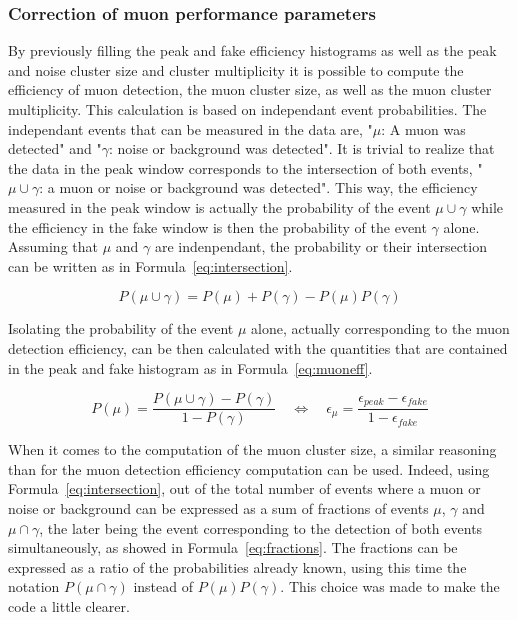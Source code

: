 		\subsubsection{Correction of muon performance parameters}
		\label{app2:sssec:effcorr}
		
	By previously filling the peak and fake efficiency histograms as well as the peak and noise cluster size and cluster multiplicity it is possible to compute the efficiency of muon detection, the muon cluster size, as well as the muon cluster multiplicity. This calculation is based on independant event probabilities. The independant events that can be measured in the data are, "$\mu$: A muon was detected" and "$\gamma$: noise or background was detected". It is trivial to realize that the data in the peak window corresponds to the intersection of both events, "$\mu\cup\gamma$: a muon or noise or background was detected". This way, the efficiency measured in the peak window is actually the probability of the event $\mu\cup\gamma$ while the efficiency in the fake window is then the probability of the event $\gamma$ alone. Assuming that $\mu$ and $\gamma$ are indenpendant, the probability or their intersection can be written as in Formula~\ref{eq:intersection}.
	
	\begin{equation}
	\label{eq:intersection}
	P(\mu\cup\gamma) = P(\mu) + P(\gamma) - P(\mu)P(\gamma)
	\end{equation}
	
	Isolating the probability of the event $\mu$ alone, actually corresponding to the muon detection efficiency, can be then calculated with the quantities that are contained in the peak and fake histogram as in Formula~\ref{eq:muoneff}.
	
	\begin{equation}
	\label{eq:muoneff}
	P(\mu) = \frac{P(\mu\cup\gamma) - P(\gamma)}{1 - P(\gamma)} \quad \Leftrightarrow \quad \epsilon_{\mu} = \frac{\epsilon_{peak} - \epsilon_{fake}}{1 - \epsilon_{fake}}
	\end{equation}
	
	 When it comes to the computation of the muon cluster size, a similar reasoning than for the muon detection efficiency computation can be used. Indeed, using Formula~\ref{eq:intersection}, out of the total number of events where a muon or noise or background can be expressed as a sum of fractions of events $\mu$, $\gamma$ and $\mu\cap\gamma$, the later being the event corresponding to the detection of both events simultaneously, as showed in Formula~\ref{eq:fractions}. The fractions can be expressed as a ratio of the probabilities already known, using this time the notation $P(\mu\cap\gamma)$ instead of $P(\mu)P(\gamma)$. This choice was made to make the code a little clearer.
	
